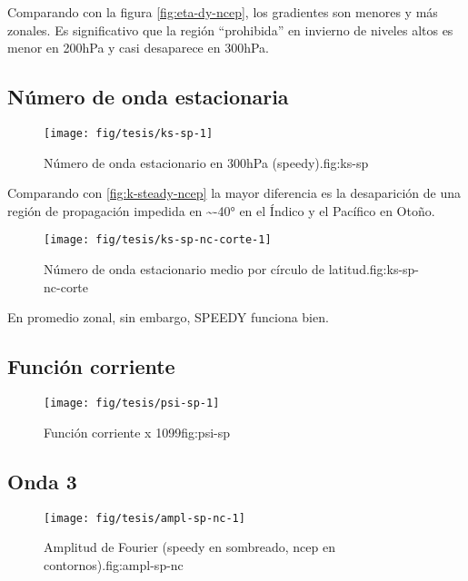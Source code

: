 \documentclass[spanish,a4paper]{book}
\begin{document}
Comparando con la figura \autoref{fig:eta-dy-ncep}, los gradientes son
menores y más zonales. Es significativo que la región ``prohibida'' en
invierno de niveles altos es menor en 200hPa y casi desaparece en
300hPa.

\subsection{Número de onda
estacionaria}\label{numero-de-onda-estacionaria-1}

\begin{figure}
\texttt{[image: fig/tesis/ks-sp-1]} \caption{Número de onda estacionario en 300hPa (speedy).{fig:ks-sp}}\label{fig:ks-sp}
\end{figure}

Comparando con \autoref{fig:k-steady-ncep} la mayor diferencia es la
desaparición de una región de propagación impedida en
\textasciitilde{}-40° en el Índico y el Pacífico en Otoño.

\begin{figure}

{\centering \texttt{[image: fig/tesis/ks-sp-nc-corte-1]} 

}

\caption{Número de onda estacionario medio por círculo de latitud.{fig:ks-sp-nc-corte}}\label{fig:ks-sp-nc-corte}
\end{figure}

En promedio zonal, sin embargo, SPEEDY funciona bien.

\subsection{Función corriente}\label{funcion-corriente-2}

\begin{figure}

{\centering \texttt{[image: fig/tesis/psi-sp-1]} 

}

\caption{Función corriente x 1099{fig:psi-sp}}\label{fig:psi-sp}
\end{figure}

\subsection{Onda 3}\label{onda-3-1}

\begin{figure*}
\texttt{[image: fig/tesis/ampl-sp-nc-1]} \caption{Amplitud de Fourier (speedy en sombreado, ncep en contornos).{fig:ampl-sp-nc}}\label{fig:ampl-sp-nc}
\end{figure*}
\end{document}
